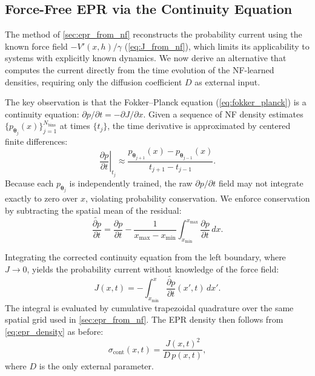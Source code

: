 \subsection{Force-Free EPR via the Continuity Equation}
\label{sec:epr_force_free}

The method of \cref{sec:epr_from_nf} reconstructs the probability current using the known force field $-V'(x,h)/\gamma$ (\cref{eq:J_from_nf}), which limits its applicability to systems with explicitly known dynamics.
We now derive an alternative that computes the current directly from the time evolution of the NF-learned densities, requiring only the diffusion coefficient $D$ as external input.

The key observation is that the Fokker--Planck equation (\cref{eq:fokker_planck}) is a continuity equation: $\partial p/\partial t = -\partial J/\partial x$.
Given a sequence of NF density estimates $\{p_{\boldsymbol{\theta}_j}(x)\}_{j=1}^{N_{\mathrm{bins}}}$ at times $\{t_j\}$, the time derivative is approximated by centered finite differences:
\begin{equation}
    \left.\frac{\partial p}{\partial t}\right|_{t_j} \approx \frac{p_{\boldsymbol{\theta}_{j+1}}(x) - p_{\boldsymbol{\theta}_{j-1}}(x)}{t_{j+1} - t_{j-1}}.
    \label{eq:dpdt_fd}
\end{equation}
Because each $p_{\boldsymbol{\theta}_j}$ is independently trained, the raw $\partial p/\partial t$ field may not integrate exactly to zero over $x$, violating probability conservation.
We enforce conservation by subtracting the spatial mean of the residual:
\begin{equation}
    \widetilde{\frac{\partial p}{\partial t}} = \frac{\partial p}{\partial t} - \frac{1}{x_{\max} - x_{\min}}\int_{x_{\min}}^{x_{\max}}\frac{\partial p}{\partial t}\,dx.
    \label{eq:dpdt_corrected}
\end{equation}

Integrating the corrected continuity equation from the left boundary, where $J \to 0$, yields the probability current without knowledge of the force field:
\begin{equation}
    J(x,t) = -\int_{x_{\min}}^{x}\widetilde{\frac{\partial p}{\partial t}}(x',t)\,dx'.
    \label{eq:J_continuity}
\end{equation}
The integral is evaluated by cumulative trapezoidal quadrature over the same spatial grid used in \cref{sec:epr_from_nf}.
The EPR density then follows from \cref{eq:epr_density} as before:
\begin{equation}
    \sigma_{\mathrm{cont}}(x,t) = \frac{J(x,t)^2}{D\,p(x,t)},
    \label{eq:epr_continuity}
\end{equation}
where $D$ is the only external parameter.

